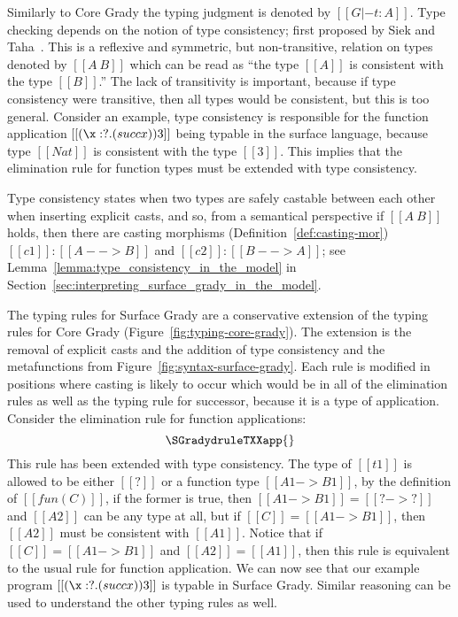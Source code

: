 Similarly to Core Grady the typing judgment is denoted by
$[[G |- t : A]]$.  Type checking depends on the notion of type consistency;
first proposed by Siek and Taha~\cite{Siek:2006}.  This is a reflexive
and symmetric, but non-transitive, relation on types denoted by
$[[A ~ B]]$ which can be read as ``the type $[[A]]$ is consistent with
the type $[[B]]$.''  The lack of transitivity is important, because
if type consistency were transitive, then all types would be
consistent, but this is too general. Consider an example, type
consistency is responsible for the function application $[[(\x:?.(succ
    x)) 3]]$ being typable in the surface language, because type
$[[Nat]]$ is consistent with the type $[[3]]$.  This implies that the
elimination rule for function types must be extended with type
consistency.

Type consistency states when two types are safely castable between
each other when inserting explicit casts, and so, from a semantical
perspective if $[[A ~ B]]$ holds, then there are casting
morphisms (Definition~\ref{def:casting-mor}) $[[c1]] : [[A --> B]]$
and $[[c2]] : [[B --> A]]$; see
Lemma~\ref{lemma:type_consistency_in_the_model} in
Section~\ref{sec:interpreting_surface_grady_in_the_model}.

The typing rules for Surface Grady are a conservative extension of the
typing rules for Core Grady (Figure~\ref{fig:typing-core-grady}). The
extension is the removal of explicit casts and the addition of type
consistency and the metafunctions from
Figure~\ref{fig:syntax-surface-grady}.  Each rule is modified in
positions where casting is likely to occur which would be in all of
the elimination rules as well as the typing rule for successor,
because it is a type of application.  Consider the elimination rule
for function applications:
\[
\SGradydruleTXXapp{}
\]
This rule has been extended with type consistency.  The type of
$[[t1]]$ is allowed to be either $[[?]]$ or a function type $[[A1 ->
    B1]]$, by the definition of $[[fun(C)]]$, if the former is true,
then $[[A1 -> B1]] = [[? -> ?]]$ and $[[A2]]$ can be any type at all,
but if $[[C]] = [[A1 -> B1]]$, then $[[A2]]$ must be consistent with
$[[A1]]$.  Notice that if $[[C]] = [[A1 -> B1]]$ and $[[A2]] =
[[A1]]$, then this rule is equivalent to the usual rule for function
application. We can now see that our example program $[[(\x:?.(succ
    x)) 3]]$ is typable in Surface Grady.  Similar reasoning can be
used to understand the other typing rules as well.

